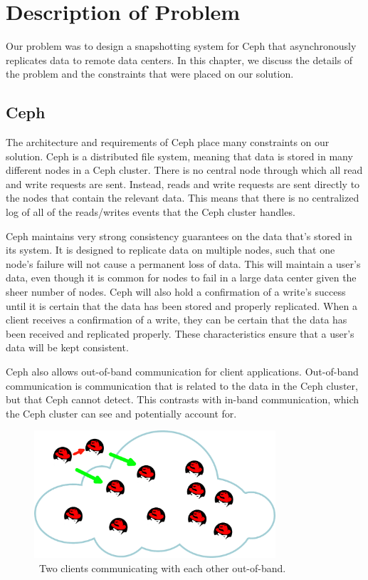 \chapter{Description of Problem}
\label{sec:description}

Our problem was to design a snapshotting system for Ceph that
asynchronously replicates data to remote data centers. In this
chapter, we discuss the details of the problem and the constraints
that were placed on our solution.

\section{Ceph}

The architecture and requirements of Ceph place many constraints on
our solution. Ceph is a distributed file system, meaning that data is
stored in many different nodes in a Ceph cluster. There is no central
node through which all read and write requests are sent.  Instead,
reads and write requests are sent directly to the nodes that contain
the relevant data. This means that there is no centralized log of all
of the reads/writes events that the Ceph cluster handles.

Ceph maintains very strong consistency guarantees on the data that's
stored in its system. It is designed to replicate data on multiple
nodes, such that one node's failure will not cause a permanent loss of
data. This will maintain a user's data, even though it is common for
nodes to fail in a large data center given the sheer number of
nodes. Ceph will also hold a confirmation of a write's success until
it is certain that the data has been stored and properly
replicated. When a client receives a confirmation of a write, they can
be certain that the data has been received and replicated
properly. These characteristics ensure that a user's data will be kept
consistent.

Ceph also allows out-of-band communication for client applications.
Out-of-band communication is communication that is related to the data
in the Ceph cluster, but that Ceph cannot detect. This contrasts with
in-band communication, which the Ceph cluster can see and potentially
account for.

\begin{figure}[!htbp]
  \centering
  \caption{~Two clients communicating with each other out-of-band.} 
  \label{fig:out-of-band}
  \includegraphics[width=0.8\textwidth]{outofbandwrite.png}
\end{figure}


